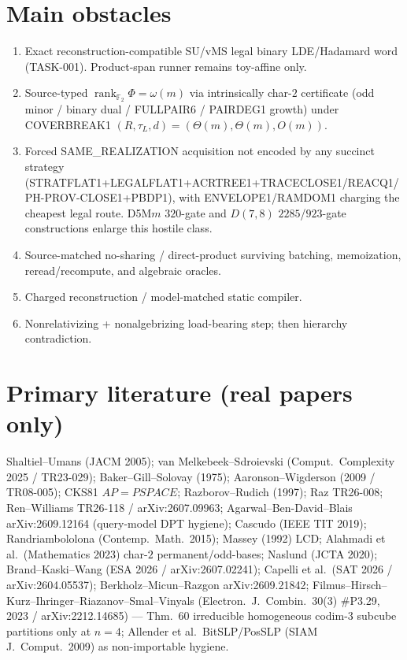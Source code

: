 \documentclass[11pt]{article}
\begin{document}
\section*{Main obstacles}
\begin{enumerate}
\item Exact reconstruction-compatible SU/vMS legal binary LDE/Hadamard word
(TASK-001). Product-span runner remains toy-affine only.
\item Source-typed $\operatorname{rank}_{\mathbb F_2}\Phi=\omega(m)$ via
intrinsically char-$2$ certificate (odd minor / binary dual / FULLPAIR6 /
PAIRDEG1 growth) under COVERBREAK1
$(R,\tau_L,d)=(\Theta(m),\Theta(m),O(m))$.
\item Forced SAME\_REALIZATION acquisition not encoded by any succinct strategy
(STRATFLAT1+LEGALFLAT1+ACRTREE1+TRACECLOSE1/REACQ1/PH-PROV-CLOSE1+PBDP1), with
ENVELOPE1/RAMDOM1 charging the cheapest legal route. D5M$m$ $320$-gate and
$D(7,8)$ $2285$/$923$-gate constructions enlarge this hostile class.
\item Source-matched no-sharing / direct-product surviving batching, memoization,
reread/recompute, and algebraic oracles.
\item Charged reconstruction / model-matched static compiler.
\item Nonrelativizing + nonalgebrizing load-bearing step; then hierarchy
contradiction.
\end{enumerate}

\section*{Primary literature (real papers only)}
Shaltiel--Umans (JACM 2005); van Melkebeek--Sdroievski (Comput.\ Complexity 2025 /
TR23-029); Baker--Gill--Solovay (1975); Aaronson--Wigderson (2009 / TR08-005);
CKS81 $AP=PSPACE$; Razborov--Rudich (1997); Raz TR26-008; Ren--Williams TR26-118 /
arXiv:2607.09963; Agarwal--Ben-David--Blais arXiv:2609.12164 (query-model DPT
hygiene); Cascudo (IEEE TIT 2019); Randriambololona (Contemp.\ Math.\ 2015);
Massey (1992) LCD; Alahmadi et al.\ (Mathematics 2023) char-$2$ permanent/odd-bases;
Naslund (JCTA 2020); Brand--Kaski--Wang (ESA 2026 / arXiv:2607.02241);
Capelli et al.\ (SAT 2026 / arXiv:2604.05537); Berkholz--Micun--Razgon
arXiv:2609.21842; Filmus--Hirsch--Kurz--Ihringer--Riazanov--Smal--Vinyals
(Electron.\ J.\ Combin.\ 30(3) \#P3.29, 2023 / arXiv:2212.14685) --- Thm.~60
irreducible homogeneous codim-3 subcube partitions only at $n=4$;
Allender et al.\ BitSLP/PosSLP (SIAM J.\ Comput.\ 2009) as non-importable hygiene.
\end{document}
